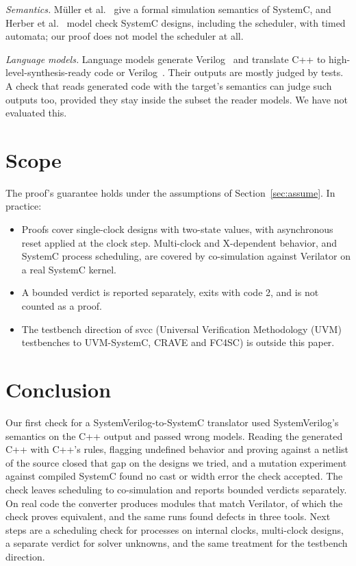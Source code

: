 \documentclass{ieeeaccess}
\newcommand{\code}[1]{{\fontshape{n}\ttfamily #1}}
\begin{document}
\emph{Semantics.} Müller et al.~\cite{mueller2001scsem} give a formal simulation semantics of
SystemC, and Herber et al.~\cite{herber2008scta} model check SystemC designs, including the
scheduler, with timed automata; our proof does not model the scheduler at all.

\emph{Language models.} Language models generate Verilog~\cite{liu2023verilogeval} and
translate C++ to high-level-synthesis-ready code or Verilog~\cite{collini2024c2hlsc,lyu2026autoc2v}. Their outputs
are mostly judged by tests. A check
that reads generated code with the target's semantics can judge such outputs too, provided they
stay inside the subset the reader models. We have not evaluated this.

\section{Scope}
\label{sec:limits}

The proof's guarantee holds under the assumptions of Section~\ref{sec:assume}. In practice:

\begin{itemize}
\item Proofs cover single-clock designs with two-state values, with asynchronous reset applied at
the clock step. Multi-clock and X-dependent behavior, and SystemC process scheduling, are covered
by co-simulation against Verilator on a real SystemC kernel.
\item A bounded verdict is reported separately, exits with code 2, and is not counted as a proof.
\item The testbench direction of \code{svcc} (Universal Verification Methodology (UVM) testbenches to UVM-SystemC, CRAVE and FC4SC) is outside this paper.
\end{itemize}

\section{Conclusion}
\label{sec:conclusion}

Our first check for a SystemVerilog-to-SystemC translator used SystemVerilog's semantics on the
C++ output and passed wrong models. Reading the generated C++ with C++'s rules, flagging undefined
behavior and proving against a netlist of the source closed that gap on the designs we tried, and a
mutation experiment against compiled SystemC found no cast or width error the check accepted. The
check leaves scheduling to co-simulation and reports bounded verdicts separately. On real code the converter
produces \nMatch{} modules that match Verilator, \nCorpusProved{} of which the check proves
equivalent, and the same runs found defects in three tools. Next steps are a scheduling check for
processes on internal clocks, multi-clock designs, a separate verdict for solver unknowns, and the
same treatment for the testbench direction.
\end{document}
